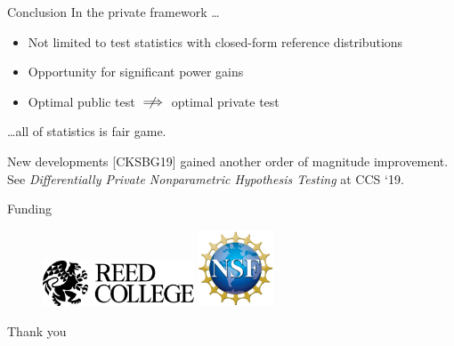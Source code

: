 \documentclass{beamer}
\begin{document}
\begin{frame}{Conclusion}
\pause
\large In the private framework \ldots \par \pause
 \normalsize
\begin{itemize}
	\item Not limited to test statistics with closed-form reference distributions \pause
	\item Opportunity for significant power gains \pause
	\item Optimal public test $\centernot \implies$ optimal private test \pause
\end{itemize}

\large \ldots all of statistics is fair game. \pause
 \normalsize
 
 \begin{block}{New developments}
[CKSBG19] gained another order of magnitude improvement. See \textit{Differentially Private Nonparametric Hypothesis Testing} at CCS `19.
 \end{block} \pause
Funding
\begin{figure}
\includegraphics[width=0.4\textwidth]{images/reed-logo}%
\includegraphics[width=0.2\textwidth]{images/NSF-logo}
\end{figure}

\end{frame}



\begin{frame}{}
    \begin{center}
        \Huge Thank you
    \end{center}    
\end{frame}
\end{document}
